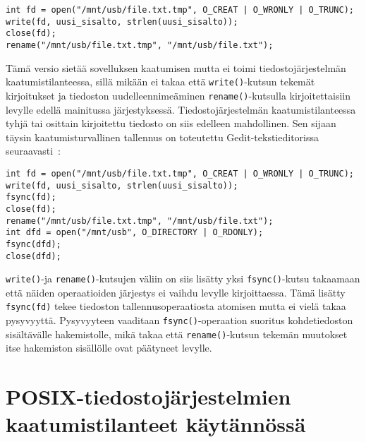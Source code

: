 \begin{verbatim}
int fd = open("/mnt/usb/file.txt.tmp", O_CREAT | O_WRONLY | O_TRUNC);
write(fd, uusi_sisalto, strlen(uusi_sisalto));
close(fd);
rename("/mnt/usb/file.txt.tmp", "/mnt/usb/file.txt");
\end{verbatim}

Tämä versio sietää sovelluksen kaatumisen mutta ei toimi tiedostojärjestelmän kaatumistilanteessa,
sillä mikään ei takaa että \texttt{write()}-kutsun tekemät kirjoitukset ja tiedoston uudelleennimeäminen \texttt{rename()}-kutsulla kirjoitettaisiin levylle edellä mainitussa järjestyksessä.
Tiedostojärjestelmän kaatumistilanteessa tyhjä tai osittain kirjoitettu tiedosto on siis edelleen mahdollinen.
Sen sijaan täysin kaatumisturvallinen tallennus on toteutettu Gedit-tekstieditorissa seuraavasti~\cite{OptimisticCrashConsistency}:

\begin{verbatim}
int fd = open("/mnt/usb/file.txt.tmp", O_CREAT | O_WRONLY | O_TRUNC);
write(fd, uusi_sisalto, strlen(uusi_sisalto));
fsync(fd);
close(fd);
rename("/mnt/usb/file.txt.tmp", "/mnt/usb/file.txt");
int dfd = open("/mnt/usb", O_DIRECTORY | O_RDONLY);
fsync(dfd);
close(dfd);
\end{verbatim}

\texttt{write()}-ja \texttt{rename()}-kutsujen väliin on siis lisätty yksi \texttt{fsync()}-kutsu takaamaan että näiden operaatioiden järjestys ei vaihdu levylle kirjoittaessa.
Tämä lisätty \texttt{fsync(fd)} tekee tiedoston tallennusoperaatiosta atomisen mutta ei vielä takaa pysyvyyttä.
Pysyvyyteen vaaditaan \texttt{fsync()}-operaation suoritus kohdetiedoston sisältävälle hakemistolle,
mikä takaa että \texttt{rename()}-kutsun tekemän muutokset itse hakemiston sisällölle ovat päätyneet levylle.

\section{POSIX-tiedostojärjestelmien kaatumistilanteet käytännössä}
\label{ChapPosixSafetyStudy}

